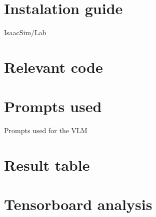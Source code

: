 \section{Instalation guide}
IsaacSim/Lab
\section{Relevant code}
\section{Prompts used}
Prompts used for the VLM
\section{Result table}
\section{Tensorboard analysis}
